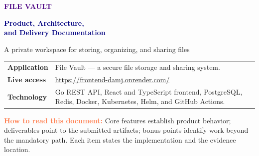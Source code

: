 \documentclass[11pt,a4paper]{article}
\begin{document}
\begin{titlepage}\thispagestyle{empty}\vspace*{0.7in}\begin{center}
{\Large\textcolor{indigo}{\textbf{FILE VAULT}}}\par\vspace{0.22in}
{\fontsize{31}{36}\selectfont\textcolor{navy}{\textbf{Product, Architecture,\\[2pt] and Delivery Documentation}}}\par\vspace{0.22in}
{\large\textcolor{muted}{A private workspace for storing, organizing, and sharing files}}\par\vspace{0.55in}
\vspace{0.22in}
\end{center}\vfill
\begin{tabularx}{\textwidth}{P{0.26\textwidth}Y}\toprule
\midrule\textbf{Application} & File Vault --- a secure file storage and sharing system.\\
\textbf{Live access} & \url{https://frontend-damj.onrender.com/}\\
\textbf{Technology} & Go REST API, React and TypeScript frontend, PostgreSQL, Redis, Docker, Kubernetes, Helm, and GitHub Actions.\\
\bottomrule\end{tabularx}\vspace{0.25in}\end{titlepage}
\tableofcontents\newpage

\begin{tcolorbox}[enhanced,colback=peach,colframe=coral,boxrule=0.7pt,arc=5pt,left=10pt,right=10pt,top=7pt,bottom=7pt]
\textcolor{coral}{\textbf{How to read this document:}} Core features establish product behavior; deliverables point to the submitted artifacts; bonus points identify work beyond the mandatory path. Each item states the implementation and the evidence location.
\end{tcolorbox}
\end{document}
